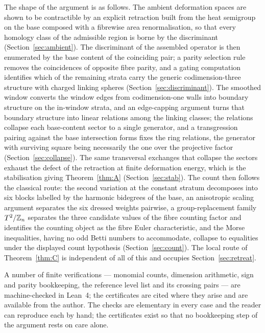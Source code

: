 \documentclass[11pt]{article}
\numberwithin{equation}{section}
\theoremstyle{plain}
\theoremstyle{definition}
\theoremstyle{remark}
\newcommand{\Zn}[1][n]{\mathbb{Z}_{#1}}
\begin{document}
The shape of the argument is as follows. The ambient deformation
spaces are shown to be contractible by an explicit retraction built
from the heat semigroup on the base composed with a fibrewise area
renormalisation, so that every homology class of the admissible
region is borne by the discriminant (Section~\ref{sec:ambient}).
The discriminant of the assembled operator is then enumerated by
the base content of the coinciding pair; a parity selection rule
removes the coincidences of opposite fibre parity, and a gating
computation identifies which of the remaining strata carry the
generic codimension-three structure with charged linking spheres
(Section~\ref{sec:discriminant}). The smoothed window converts the
window edges from codimension-one walls into boundary structure on
the in-window strata, and an edge-capping argument turns that
boundary structure into linear relations among the linking classes;
the relations collapse each base-content sector to a single
generator, and a transgression pairing against the base
intersection forms fixes the ring relations, the generator with
surviving square being necessarily the one over the projective
factor (Section~\ref{sec:collapse}). The same transversal exchanges
that collapse the sectors exhaust the defect of the retraction at
finite deformation energy, which is the stabilisation giving
Theorem~\ref{thm:A} (Section~\ref{sec:stab}). The count then
follows the classical route: the second variation at the constant
stratum decomposes into six blocks labelled by the harmonic
bidegrees of the base, an anisotropic scaling argument separates
the six dressed weights pairwise, a group-replacement family
$\Ttwo/\Zn$ separates the three candidate values of the fibre
counting factor and identifies the counting object as the fibre
Euler characteristic, and the Morse inequalities, having no odd
Betti numbers to accommodate, collapse to equalities under the
displayed count hypothesis (Section~\ref{sec:count}). The local route of
Theorem~\ref{thm:C} is independent of all of this and occupies
Section~\ref{sec:retreat}.

A number of finite verifications --- monomial counts, dimension
arithmetic, sign and parity bookkeeping, the reference level list
and its crossing pairs --- are machine-checked in Lean~4; the
certificates are cited where they arise and are available from the
author. The checks are elementary in every case and the reader can
reproduce each by hand; the certificates exist so that no
bookkeeping step of the argument rests on care alone.
\end{document}
